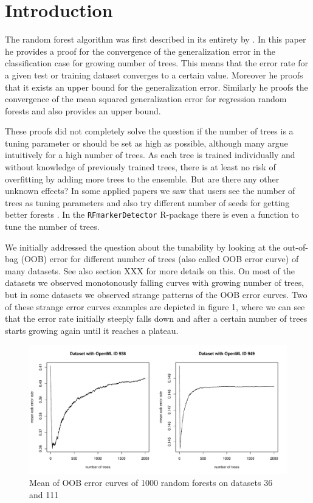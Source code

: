 \documentclass[paper=a4
               ,12pt
               ,DIV=12
               ,parskip=half
               ,titlepage=on
               ,headinclude 
               ,footinclude
               ,headsepline
               ,footsepline         %
               ,ilines 
               ]{scrartcl}
\begin{document}
\section{Introduction}

The random forest algorithm was first described in its entirety by \citet{Breiman2001}. In this paper he provides a proof for the convergence of the generalization error in the classification case for growing number of trees. 
This means that the error rate for a given test or training dataset converges to a certain value. Moreover he proofs that it exists an upper bound for the generalization error. Similarly he proofs the convergence of the mean squared generalization error for regression random forests and  
also provides an upper bound. 

These proofs did not completely solve the question if the number of trees is a tuning parameter or should be set as high as possible, although many argue intuitively for a high number of trees. 
As each tree is trained individually and without knowledge of previously trained trees, there is at least no risk of overfitting by adding more trees to the ensemble. But are there any other unknown effects?
In some applied papers \citep{Raghu2015, Barman2014} we saw that users see the 
number of trees as tuning parameters and also try different number of seeds for getting better forests \citep{Barman2014}. In the \texttt{RFmarkerDetector} R-package \citep{Palla2016} there is 
even a function to tune the number of trees. 

We initially addressed the question about the tunability by looking at the out-of-bag (OOB) error for different number of trees (also called OOB error curve) of many datasets. See also section XXX for more details on this. 
On most of the datasets we observed monotonously falling curves with growing number of trees, but in some datasets we observed strange patterns of the OOB error curves. Two of these strange error curves examples are depicted in figure 1, 
where we can see that the error rate initially steeply falls down and after a certain number of trees starts growing again until it reaches a plateau. 

\begin{figure}[!htb]
\begin{center}
  \includegraphics[width=\textwidth]{initial_example.pdf}
  \caption{Mean of OOB error curves of 1000 random forests on datasets 36 and 111}
\end{center}
\end{figure}
\end{document}
